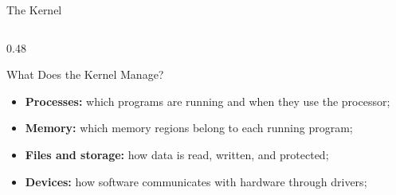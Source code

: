 \begin{frame}{The Kernel}
\begin{columns}[T]
\begin{column}{0.48\textwidth}
        \begin{block}{What Does the Kernel Manage?}
        \begin{itemize}
            \setlength{\itemsep}{0.22em}
            \item \textbf{Processes:} which programs are running and when they use the processor;
            \item \textbf{Memory:} which memory regions belong to each running program;
            \item \textbf{Files and storage:} how data is read, written, and protected;
            \item \textbf{Devices:} how software communicates with hardware through drivers;
        \end{itemize}
        \end{block}
        
        
    \end{column}

\end{columns}

\end{frame}


